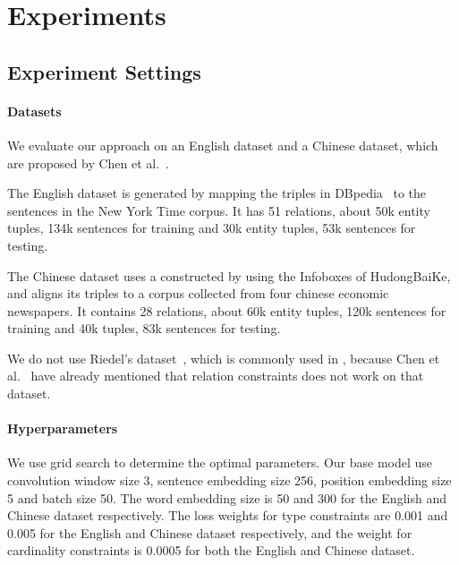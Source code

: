 \section{Experiments}

\subsection{Experiment Settings}
\paragraph{Datasets}
We evaluate our approach on an English dataset and a Chinese dataset, which are proposed by Chen et al.~.


The English dataset is generated by mapping the triples in DBpedia~\cite{bizer2009dbpedia} to the sentences in the New York Time corpus. It has 51 relations, about 50k entity tuples, 134k sentences for training and 30k entity tuples, 53k sentences for testing.

The Chinese dataset uses a \KB constructed by using the Infoboxes of HudongBaiKe,
and aligns its triples to a corpus collected from four chinese economic newspapers.
It contains 28 relations, about 60k entity tuples, 120k sentences for training and 40k tuples, 83k sentences for testing.

We do not use Riedel's dataset~\cite{riedel2010modeling}, which is commonly used in \RE, because  Chen et al.~ have already mentioned that relation constraints does not work on that dataset.


\paragraph{Hyperparameters}
We use grid search to determine the optimal parameters.
Our base model use convolution window size 3, sentence embedding size 256, position embedding size 5 and batch size 50.
The word embedding size is 50 and 300 for the English and Chinese dataset respectively.
The loss weights for type constraints are 0.001 and 0.005 for the English and Chinese dataset respectively, 
and the weight for cardinality constraints is 0.0005 for both the English and Chinese dataset.


